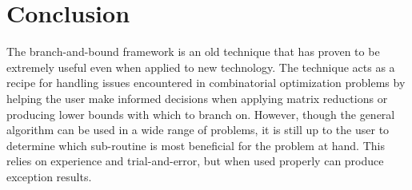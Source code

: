 \section{Conclusion}
	The branch-and-bound framework is an old technique that has proven to be extremely useful even when applied to new technology. The technique acts as a recipe for handling issues encountered in combinatorial optimization problems by helping the user make informed decisions when applying matrix reductions or producing lower bounds with which to branch on. However, though the general algorithm can be used in a wide range of problems, it is still up to the user to determine which sub-routine is most beneficial for the problem at hand. This relies on experience and trial-and-error, but when used properly can produce exception results.  